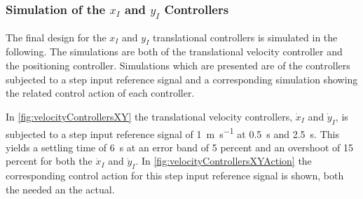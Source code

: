 \subsubsection{Simulation of the $x_I$ and $y_I$ Controllers}
The final design for the $x_I$ and $y_I$ translational controllers is simulated in the following. The simulations are both of the translational velocity controller and the positioning controller. Simulations which are presented are of the controllers subjected to a step input reference signal and a corresponding simulation showing the related control action of each controller. 

In \autoref{fig:velocityControllersXY} the translational velocity controllers, $\dot{x}_I$ and $\dot{y}_I$, is subjected to a step input reference signal of \SI{1}{m s^{-1}} at \SI{0.5}{s} and \SI{2.5}{s}. This yields a settling time of \SI{6}{s} at an error band of 5 percent and an overshoot of 15 percent for both the $\dot{x}_I$ and $\dot{y}_I$. In \autoref{fig:velocityControllersXYAction} the corresponding control action for this step input reference signal is shown, both the needed an the actual.

